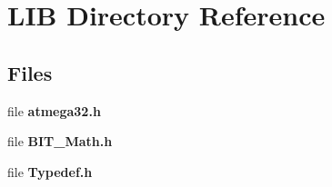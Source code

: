 \section{L\+IB Directory Reference}
\label{dir_c49787b21523dfcd643eafa322448430}
\subsection*{Files}
\begin{DoxyCompactItemize}
\item 
file \textbf{ atmega32.\+h}
\item 
file \textbf{ B\+I\+T\+\_\+\+Math.\+h}
\item 
file \textbf{ Typedef.\+h}
\end{DoxyCompactItemize}
